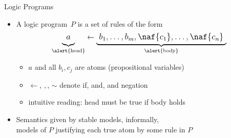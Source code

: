 \begin{frame}{Logic \alert<1>{Programs}}
  \begin{itemize}
  \item<2->
    A \alert{logic program}~$P$ is a \alert{set of rules} of the form
    \[\large
    \underbrace{a\raisebox{-4pt}{}}_{\text{\alert{head}}}\leftarrow\underbrace{\raisebox{-4pt}{\ }b_1,\dots,b_m,\naf{c_1},\dots,\naf{c_n}\raisebox{-4pt}{\ }}_{\alert{\text{body}}}
    \]
    \begin{itemize}
    \item $a$ and all $b_i,c_j$ are \alert{atoms} (propositional variables)
    \item \alert{$\leftarrow$}, \alert{$,$}, \alert{$\sim$} denote \alert{if}, \alert{and}, and \alert{negation}
    \item intuitive reading: \alert{head} must be true \alert{if body} holds
    \end{itemize}
    \medskip
  \item<3->
    Semantics given by \alert{stable models}, informally,\\
    models of $P$ justifying each true atom by some rule in $P$
  \end{itemize}
\end{frame}
